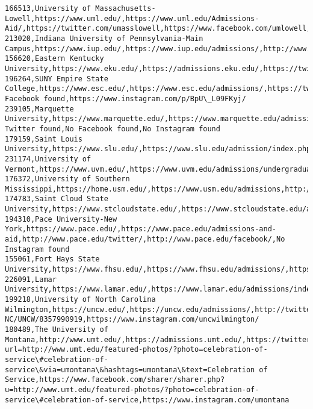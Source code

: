 \documentclass[11pt]{article}
\begin{document}
\begin{Verbatim}[commandchars=\\\{\}]
166513,University of Massachusetts-Lowell,https://www.uml.edu/,https://www.uml.edu/Admissions-Aid/,https://twitter.com/umasslowell,https://www.facebook.com/umlowell,https://instagram.com/umasslowell
213020,Indiana University of Pennsylvania-Main Campus,https://www.iup.edu/,https://www.iup.edu/admissions/,http://www.twitter.com/iupedu,http://www.facebook.com/iupedu,http://instagram.com/iupedu
156620,Eastern Kentucky University,https://www.eku.edu/,https://admissions.eku.edu/,https://twitter.com/eku,https://www.facebook.com/easternkentuckyuniversity,https://instagram.com/easternkentuckyu
196264,SUNY Empire State College,https://www.esc.edu/,https://www.esc.edu/admissions/,https://twitter.com/@SUNYEmpire,No Facebook found,https://www.instagram.com/p/BpU\_L09FKyj/
239105,Marquette University,https://www.marquette.edu/,https://www.marquette.edu/admissions/,No Twitter found,No Facebook found,No Instagram found
179159,Saint Louis University,https://www.slu.edu/,https://www.slu.edu/admission/index.php,https://twitter.com/SLU\_Official,https://facebook.com/SaintLouisU/,https://www.instagram.com/slu\_official/
231174,University of Vermont,https://www.uvm.edu/,https://www.uvm.edu/admissions/undergraduate,http://twitter.com/uvmvermont,http://www.facebook.com/UniversityofVermont,http://instagram.com/universityofvermont
176372,University of Southern Mississippi,https://home.usm.edu/,https://www.usm.edu/admissions,http://www.twitter.com/southernmiss,http://www.facebook.com/usm.edu,http://instagram.com/officialsouthernmiss
174783,Saint Cloud State University,https://www.stcloudstate.edu/,https://www.stcloudstate.edu/admissions/,https://www.stcloudstate.edu/scsu/twitter.aspx,https://www.stcloudstate.edu/scsu/facebook.aspx,https://www.stcloudstate.edu/scsu/instagram.aspx
194310,Pace University-New York,https://www.pace.edu/,https://www.pace.edu/admissions-and-aid,http://www.pace.edu/twitter/,http://www.pace.edu/facebook/,No Instagram found
155061,Fort Hays State University,https://www.fhsu.edu/,https://www.fhsu.edu/admissions/,https://twitter.com/forthaysstate,http://www.facebook.com/forthaysstate,http://instagram.com/forthaysstate
226091,Lamar University,https://www.lamar.edu/,https://www.lamar.edu/admissions/index.html,https://www.twitter.com/LamarUniversity,https://www.facebook.com/LamarUniversity,https://instagram.com/lamaruniversity
199218,University of North Carolina Wilmington,https://uncw.edu/,https://uncw.edu/admissions/,http://twitter.com/uncwilmington,http://www.facebook.com/pages/Wilmington-NC/UNCW/8357990919,https://www.instagram.com/uncwilmington/
180489,The University of Montana,http://www.umt.edu/,https://admissions.umt.edu/,https://twitter.com/share?url=http://www.umt.edu/featured-photos/?photo=celebration-of-service\#celebration-of-service\&via=umontana\&hashtags=umontana\&text=Celebration of Service,https://www.facebook.com/sharer/sharer.php?u=http://www.umt.edu/featured-photos/?photo=celebration-of-service\#celebration-of-service,https://www.instagram.com/umontana

\end{Verbatim}
\end{document}
